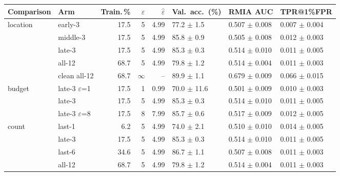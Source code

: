\begin{tabular}{@{}llrrrlll@{}}
\toprule
Comparison & Arm & Train.\,\% & $\varepsilon$ & $\hat\varepsilon$ & Val.\ acc.\ (\%) & RMIA AUC & TPR@1\%FPR \\
\midrule
location & early-3 & 17.5 & 5 & 4.99 & 77.2 $\pm$ 1.5 & 0.507 $\pm$ 0.008 & 0.007 $\pm$ 0.004 \\
 & middle-3 & 17.5 & 5 & 4.99 & 85.8 $\pm$ 0.9 & 0.505 $\pm$ 0.008 & 0.012 $\pm$ 0.003 \\
 & late-3 & 17.5 & 5 & 4.99 & 85.3 $\pm$ 0.3 & 0.514 $\pm$ 0.010 & 0.011 $\pm$ 0.005 \\
 & all-12 & 68.7 & 5 & 4.99 & 79.8 $\pm$ 1.2 & 0.514 $\pm$ 0.004 & 0.011 $\pm$ 0.003 \\
 & clean all-12 & 68.7 & $\infty$ & -- & 89.9 $\pm$ 1.1 & 0.679 $\pm$ 0.009 & 0.066 $\pm$ 0.015 \\
\midrule
budget & late-3 $\varepsilon$=1 & 17.5 & 1 & 0.99 & 70.0 $\pm$ 11.6 & 0.501 $\pm$ 0.009 & 0.010 $\pm$ 0.003 \\
 & late-3 & 17.5 & 5 & 4.99 & 85.3 $\pm$ 0.3 & 0.514 $\pm$ 0.010 & 0.011 $\pm$ 0.005 \\
 & late-3 $\varepsilon$=8 & 17.5 & 8 & 7.99 & 85.7 $\pm$ 0.6 & 0.517 $\pm$ 0.009 & 0.012 $\pm$ 0.005 \\
\midrule
count & last-1 & 6.2 & 5 & 4.99 & 74.0 $\pm$ 2.1 & 0.510 $\pm$ 0.010 & 0.014 $\pm$ 0.005 \\
 & late-3 & 17.5 & 5 & 4.99 & 85.3 $\pm$ 0.3 & 0.514 $\pm$ 0.010 & 0.011 $\pm$ 0.005 \\
 & last-6 & 34.6 & 5 & 4.99 & 86.7 $\pm$ 1.1 & 0.507 $\pm$ 0.008 & 0.011 $\pm$ 0.003 \\
 & all-12 & 68.7 & 5 & 4.99 & 79.8 $\pm$ 1.2 & 0.514 $\pm$ 0.004 & 0.011 $\pm$ 0.003 \\
\bottomrule
\end{tabular}
